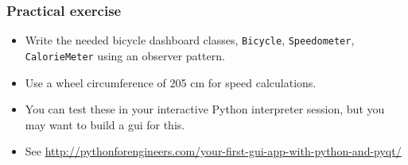 \documentclass[10pt]{beamer}
\begin{document}
\begin{frame}
	\frametitle{Practical exercise}

	\begin{itemize}
		\item Write the needed bicycle dashboard classes,
			\texttt{Bicycle}, \texttt{Speedometer},
			\texttt{CalorieMeter} using an
			observer pattern.
		\item Use a wheel circumference of 205 cm for speed calculations.
		\item You can test these in your interactive Python
			interpreter session, but you may want to 
			build a gui for this.
		\item See \url{http://pythonforengineers.com/your-first-gui-app-with-python-and-pyqt/}
	\end{itemize}
\end{frame}
\end{document}
